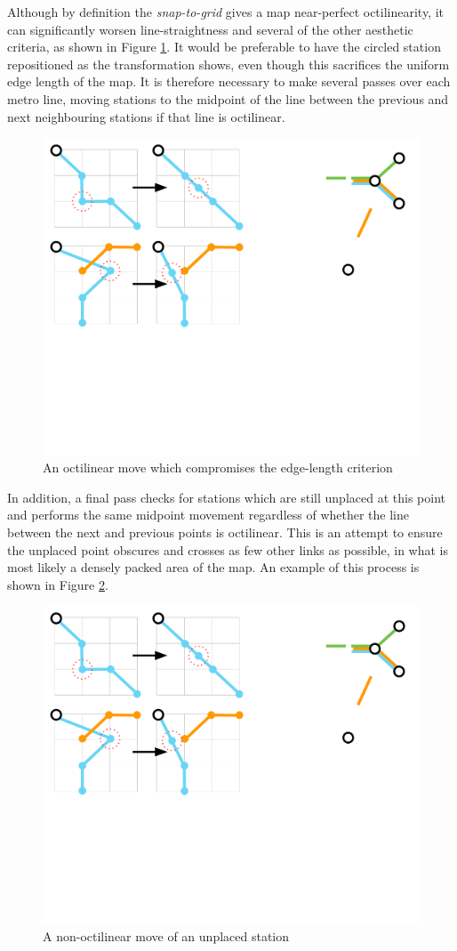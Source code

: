 Although by definition the \textit{snap-to-grid} gives a map near-perfect octilinearity, it can significantly worsen line-straightness and several of the other aesthetic criteria, as shown in Figure \ref{fig:aoct}. It would be preferable to have the circled station repositioned as the transformation shows, even though this sacrifices the uniform edge length of the map. It is therefore necessary to make several passes over each metro line, moving stations to the midpoint of the line between the previous and next neighbouring stations if that line is octilinear.
\begin{figure}[htbp!]
	\centering
	\includegraphics[width=.7\textwidth]{img/implementation/averagingoctilinear.pdf}
	\caption{An octilinear move which compromises the edge-length criterion}
	\label{fig:aoct}
\end{figure}

In addition, a final pass checks for stations which are still unplaced at this point and performs the same midpoint movement regardless of whether the line between the next and previous points is octilinear. This is an attempt to ensure the unplaced point obscures and crosses as few other links as possible, in what is most likely a densely packed area of the map. An example of this process is shown in Figure \ref{fig:nonoct}.
\begin{figure}[htbp!]
	\centering
	\includegraphics[width=.7\textwidth]{img/implementation/averagingnonoctilinear.pdf}
	\caption{A non-octilinear move of an unplaced station}
	\label{fig:nonoct}
\end{figure}


